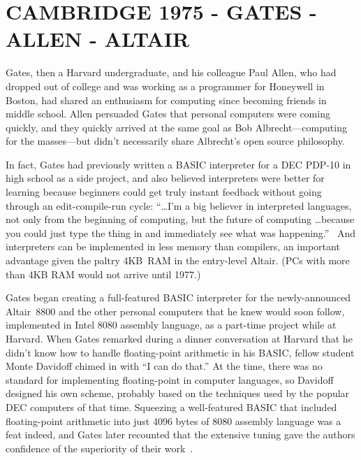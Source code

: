 
\section{CAMBRIDGE 1975 - GATES - ALLEN - ALTAIR}



Gates, then a Harvard undergraduate, and his colleague 
Paul Allen, who
had dropped out of college and was working as a programmer for Honeywell
in Boston, had shared an enthusiasm for computing since becoming
friends in middle school.
Allen persuaded Gates that personal computers were coming quickly, and
they quickly arrived at the same goal as Bob Albrecht---computing for the 
masses---but didn't necessarily share Albrecht's open source philosophy.  

In fact, Gates had
previously written a BASIC interpreter for  a DEC PDP-10 in high school
as a side project, and also believed interpreters were better for
learning because
beginners could get truly instant feedback without going through an
edit-compile-run cycle:
``\ldots I'm a big believer in interpreted languages,
not only from the beginning of computing, but the future of
computing \ldots because you could just type
the thing in and immediately see what was
happening.''~\cite{smithsonian_interview} 
And interpreters can be implemented in less memory than compilers,
an important advantage given the paltry 4KB~RAM in the entry-level  Altair.
(PCs with more than 4KB RAM would not arrive until 1977.)

Gates began creating a full-featured BASIC interpreter for the
newly-announced Altair~8800 and the other personal computers that he
knew would soon follow, implemented in Intel 8080 assembly language, as
a part-time project while at Harvard.
When Gates remarked during a dinner conversation at Harvard
that he didn't know how to handle floating-point arithmetic in his
BASIC, fellow student Monte Davidoff chimed in with ``I can do that.''
At the time, there was no standard for implementing floating-point in
computer languages, so Davidoff designed his own scheme, probably based
on the techniques used by the popular DEC computers of that time.
Squeezing a well-featured BASIC that included floating-point arithmetic
into just 
4096 bytes of 8080 assembly language was a feat indeed, and Gates later
recounted that the extensive tuning
gave the authors confidence of the superiority of their
work~\cite{programmers_at_work}.  

